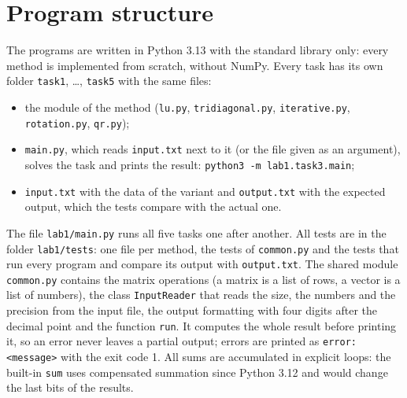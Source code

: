 \section{Program structure}

The programs are written in Python 3.13 with the standard library only: every method is
implemented from scratch, without NumPy. Every task has its own folder \texttt{task1},
\ldots, \texttt{task5} with the same files:

\begin{itemize}
    \item the module of the method (\texttt{lu.py}, \texttt{tridiagonal.py}, \texttt{iterative.py},
    \texttt{rotation.py}, \texttt{qr.py});
    \item \texttt{main.py}, which reads \texttt{input.txt} next to it (or the file given as an
    argument), solves the task and prints the result: \texttt{python3 -m lab1.task3.main};
    \item \texttt{input.txt} with the data of the variant and \texttt{output.txt} with the expected
    output, which the tests compare with the actual one.
\end{itemize}

The file \texttt{lab1/main.py} runs all five tasks one after another. All tests are in the folder
\texttt{lab1/tests}: one file per method, the tests of \texttt{common.py} and the tests that run
every program and compare its output with \texttt{output.txt}. The shared module
\texttt{common.py} contains the matrix operations (a matrix is a list of rows, a vector is a list
of numbers), the class \texttt{InputReader} that reads the size, the numbers and the precision
from the input file, the output formatting with four digits after the decimal point and the
function \texttt{run}. It computes the whole result before printing it, so an error never leaves a
partial output; errors are printed as \texttt{error: <message>} with the exit code 1. All sums are
accumulated in explicit loops: the built-in \texttt{sum} uses compensated summation since
Python 3.12 and would change the last bits of the results.




\pagebreak
